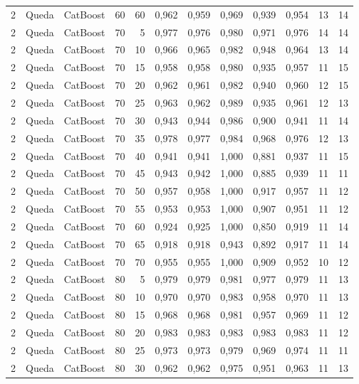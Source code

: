 \begin{longtable}{@{}rllrrrrrrrrr@{}}
2 & Queda & CatBoost & 60 & 60 & 0,962 & 0,959 & 0,969 & 0,939 & 0,954 & 13 & 14 \\
2 & Queda & CatBoost & 70 & 5 & 0,977 & 0,976 & 0,980 & 0,971 & 0,976 & 14 & 14 \\
2 & Queda & CatBoost & 70 & 10 & 0,966 & 0,965 & 0,982 & 0,948 & 0,964 & 13 & 14 \\
2 & Queda & CatBoost & 70 & 15 & 0,958 & 0,958 & 0,980 & 0,935 & 0,957 & 11 & 15 \\
2 & Queda & CatBoost & 70 & 20 & 0,962 & 0,961 & 0,982 & 0,940 & 0,960 & 12 & 15 \\
2 & Queda & CatBoost & 70 & 25 & 0,963 & 0,962 & 0,989 & 0,935 & 0,961 & 12 & 13 \\
2 & Queda & CatBoost & 70 & 30 & 0,943 & 0,944 & 0,986 & 0,900 & 0,941 & 11 & 14 \\
2 & Queda & CatBoost & 70 & 35 & 0,978 & 0,977 & 0,984 & 0,968 & 0,976 & 12 & 13 \\
2 & Queda & CatBoost & 70 & 40 & 0,941 & 0,941 & 1,000 & 0,881 & 0,937 & 11 & 15 \\
2 & Queda & CatBoost & 70 & 45 & 0,943 & 0,942 & 1,000 & 0,885 & 0,939 & 11 & 11 \\
2 & Queda & CatBoost & 70 & 50 & 0,957 & 0,958 & 1,000 & 0,917 & 0,957 & 11 & 12 \\
2 & Queda & CatBoost & 70 & 55 & 0,953 & 0,953 & 1,000 & 0,907 & 0,951 & 11 & 12 \\
2 & Queda & CatBoost & 70 & 60 & 0,924 & 0,925 & 1,000 & 0,850 & 0,919 & 11 & 14 \\
2 & Queda & CatBoost & 70 & 65 & 0,918 & 0,918 & 0,943 & 0,892 & 0,917 & 11 & 14 \\
2 & Queda & CatBoost & 70 & 70 & 0,955 & 0,955 & 1,000 & 0,909 & 0,952 & 10 & 12 \\
2 & Queda & CatBoost & 80 & 5 & 0,979 & 0,979 & 0,981 & 0,977 & 0,979 & 11 & 13 \\
2 & Queda & CatBoost & 80 & 10 & 0,970 & 0,970 & 0,983 & 0,958 & 0,970 & 11 & 13 \\
2 & Queda & CatBoost & 80 & 15 & 0,968 & 0,968 & 0,981 & 0,957 & 0,969 & 11 & 12 \\
2 & Queda & CatBoost & 80 & 20 & 0,983 & 0,983 & 0,983 & 0,983 & 0,983 & 11 & 12 \\
2 & Queda & CatBoost & 80 & 25 & 0,973 & 0,973 & 0,979 & 0,969 & 0,974 & 11 & 11 \\
2 & Queda & CatBoost & 80 & 30 & 0,962 & 0,962 & 0,975 & 0,951 & 0,963 & 11 & 13 \\

\end{longtable}
